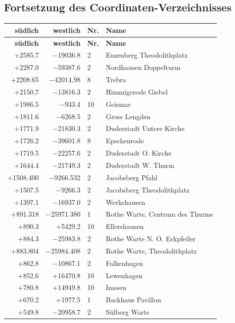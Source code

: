 \documentclass[12pt,a4paper]{article}
\begin{document}
\newpage
\subsection*{Fortsetzung des Coordinaten-Verzeichnisses}

\small

\begin{longtable}{r r l p{6cm}}
\toprule
\textbf{s\"udlich} & \textbf{westlich} & \textbf{Nr.} & \textbf{Name} \\
\midrule
\endfirsthead
\toprule
\textbf{s\"udlich} & \textbf{westlich} & \textbf{Nr.} & \textbf{Name} \\
\midrule
\endhead
\bottomrule
\endfoot
+2585.7 & $-$19036.8 & 2 & Euzenberg Theodolithplatz \\
+2287.0 & $-$59387.6 & 2 & Nordhausen Doppelturm \\
+2208.65 & $-$42014.98 & 8 & Trebra \\
+2150.7 & $-$13816.3 & 2 & Himmigerode Giebel \\
+1986.5 & $-$933.4 & 10 & Geismar \\
+1811.6 & $-$6268.5 & 2 & Gross Lengden \\
+1771.9 & $-$21830.3 & 2 & Duderstadt Untere Kirche \\
+1726.2 & $-$39601.8 & 8 & Epschenrode \\
+1719.5 & $-$22257.6 & 2 & Duderstadt O. Kirche \\
+1644.4 & $-$21749.3 & 2 & Duderstadt W. Thurm \\
+1508.400 & $-$9266.532 & 2 & Jacobsberg Pfahl \\
+1507.5 & $-$9266.3 & 2 & Jacobsberg Theodolithplatz \\
+1397.1 & $-$16937.0 & 2 & Werkshausen \\
+891.318 & $-$25971.380 & 1 & Rothe Warte, Centrum des Thurms \\
+890.3 & +5429.2 & 10 & Ellershausen \\
+884.3 & $-$25983.8 & 2 & Rothe Warte N. O. Eckpfeiler \\
+883.804 & $-$25984.408 & 2 & Rothe Warte, Theodolithplatz \\
+862.8 & $-$10867.1 & 2 & Falkenhagen \\
+852.6 & +16470.8 & 10 & Lewenhagen \\
+780.8 & +14949.8 & 10 & Imssen \\
+670.2 & +1977.5 & 1 & Backhaus Pavillon \\
+549.8 & $-$20958.7 & 2 & S\"ulberg Warte \\

\end{longtable}
\end{document}
